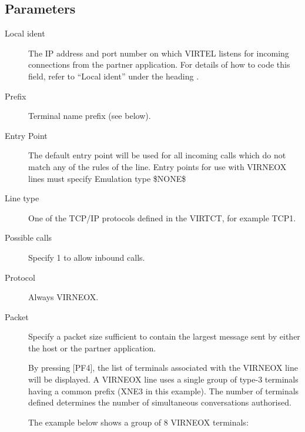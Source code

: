 \documentclass[letterpaper,10pt,english]{sphinxmanual}
\begin{document}
\subsection{Parameters}
\label{\detokenize{connectivity_guide:index-59}}\label{\detokenize{connectivity_guide:id26}}\begin{description}
\item[{Local ident}] \leavevmode
The IP address and port number on which VIRTEL listens for incoming connections from the partner application. For details of how to code this field, refer to “Local ident” under the heading {\hyperref[\detokenize{connectivity_guide:bookmark13}]{}}.

\item[{Prefix}] \leavevmode
Terminal name prefix (see below).

\item[{Entry Point}] \leavevmode
The default entry point will be used for all incoming calls which do not match any of the rules of the line. Entry points for use with VIRNEOX lines must specify Emulation type \$NONE\$

\item[{Line type}] \leavevmode
One of the TCP/IP protocols defined in the VIRTCT, for example TCP1.

\item[{Possible calls}] \leavevmode
Specify 1 to allow inbound calls.

\item[{Protocol}] \leavevmode
Always VIRNEOX.

\item[{Packet}] \leavevmode
Specify a packet size sufficient to contain the largest message sent by either the host or the partner application.

By pressing {[}PF4{]}, the list of terminals associated with the VIRNEOX line will be displayed. A VIRNEOX line uses a single group of type-3 terminals having a common prefix (XNE3 in this example). The number of terminals defined determines the number of simultaneous conversations authorised.

The example below shows a group of 8 VIRNEOX terminals:

\end{description}


\end{document}
